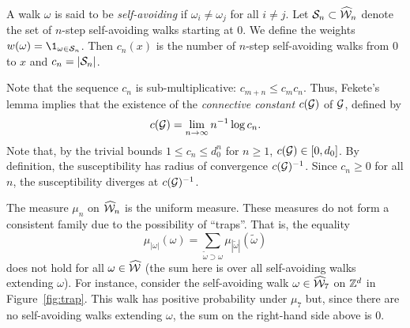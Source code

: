 

\begin{example}
A walk $\omega$ is said to be \emph{self-avoiding} if $\omega_i \ne \omega_j$
for all $i \ne j$. Let $\mathcal{S}_n \subset \widehat{\mathcal{W}}_n$ denote the set of $n$-step
self-avoiding walks starting at $0$. We define the weights $w(\omega) = \1_{\omega\in\Scal_n}$.
Then $c_n(x)$ is the number of $n$-step self-avoiding walks from $0$ to $x$
and $c_n = |\mathcal{S}_n|$.

Note that the sequence $c_n$ is sub-multiplicative: $c_{m+n} \le c_m c_n$.
Thus, Fekete's lemma implies that the existence of the \emph{connective constant}
$c(\mathcal{G})$ of $\mathcal{G}$, defined by
\begin{equation}
c(\mathcal{G}) = \lim_{n\rightarrow\infty} n^{-1} \log c_n.
\end{equation}
Note that, by the trivial bounds $1 \le c_n \le d_0^n$ for $n \ge 1$, $c(\mathcal{G}) \in [0, d_0]$.
By definition, the susceptibility has radius of convergence $c(\mathcal{G})^{-1}$.
Since $c_n \ge 0$ for all $n$, the susceptibility diverges at $c(\mathcal{G})^{-1}$.

The measure $\mu_n$ on $\widehat{\mathcal{W}}_n$ is the uniform measure.
These measures do not form a consistent family due to the possibility of ``traps''. That is, the equality
\begin{equation}
\mu_{|\omega|}(\omega) = \sum_{\tilde\omega \supset \omega} \mu_{|\tilde\omega|}(\tilde\omega)
\end{equation}
does not hold for all $\omega\in\widehat{\mathcal{W}}$ (the sum here is over all self-avoiding walks extending $\omega$).
For instance, consider the self-avoiding walk $\omega\in\widehat{\mathcal{W}}_7$ on ${ {{\mathbb Z}}^d }$ in
Figure~\ref{fig:trap}. This walk has positive probability under $\mu_7$ but,
since there are no self-avoiding walks extending $\omega$, the sum on the 
right-hand side above is $0$.


\end{example}
